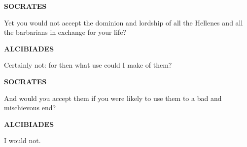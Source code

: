 \documentclass[11pt,letter]{article}
\begin{document}
\par \textbf{SOCRATES}
\par   Yet you would not accept the dominion and lordship of all the Hellenes and all the barbarians in exchange for your life?

\par \textbf{ALCIBIADES}
\par   Certainly not:  for then what use could I make of them?

\par \textbf{SOCRATES}
\par   And would you accept them if you were likely to use them to a bad and mischievous end?

\par \textbf{ALCIBIADES}
\par   I would not.
\end{document}
